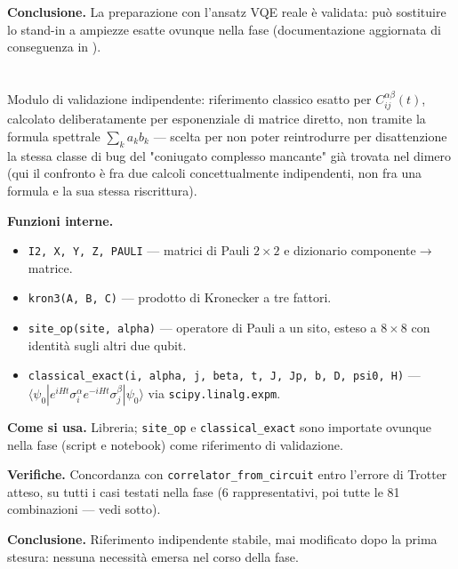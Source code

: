 \documentclass[11pt,a4paper]{article}
\begin{document}
\textbf{Conclusione.} La preparazione con l'ansatz VQE reale è validata: può
sostituire lo stand-in a ampiezze esatte ovunque nella fase (documentazione
aggiornata di conseguenza in
\texttt{}).

\section*{\texttt{}}

Modulo di validazione indipendente: riferimento classico esatto per
$C_{ij}^{\alpha\beta}(t)$, calcolato deliberatamente per esponenziale di matrice
diretto, non tramite la formula spettrale $\sum_k a_kb_k$ — scelta per non poter
reintrodurre per disattenzione la stessa classe di bug del "coniugato complesso
mancante" già trovata nel dimero (qui il confronto è fra due calcoli
concettualmente indipendenti, non fra una formula e la sua stessa riscrittura).

\textbf{Funzioni interne.}
\begin{itemize}
\item \texttt{I2, X, Y, Z, PAULI} — matrici di Pauli $2\times2$ e dizionario
componente$\to$matrice.
\item \texttt{kron3(A,\ B,\ C)} — prodotto di Kronecker a tre fattori.
\item \texttt{site\_op(site,\ alpha)} — operatore di Pauli a un sito, esteso a
$8\times8$ con identità sugli altri due qubit.
\item \texttt{classical\_exact(i,\ alpha,\ j,\ beta,\ t,\ J,\ Jp,\ b,\ D,\ psi0,\
H)} — $\langle\psi_0|e^{iHt}\sigma_i^\alpha e^{-iHt}\sigma_j^\beta|\psi_0\rangle$
via \texttt{scipy.linalg.expm}.
\end{itemize}

\textbf{Come si usa.} Libreria; \texttt{site\_op} e \texttt{classical\_exact} sono
importate ovunque nella fase (script e notebook) come riferimento di validazione.

\textbf{Verifiche.} Concordanza con \texttt{correlator\_from\_circuit} entro
l'errore di Trotter atteso, su tutti i casi testati nella fase (6 rappresentativi,
poi tutte le 81 combinazioni — vedi sotto).

\textbf{Conclusione.} Riferimento indipendente stabile, mai modificato dopo la
prima stesura: nessuna necessità emersa nel corso della fase.

\section*{\texttt{}}
\end{document}
